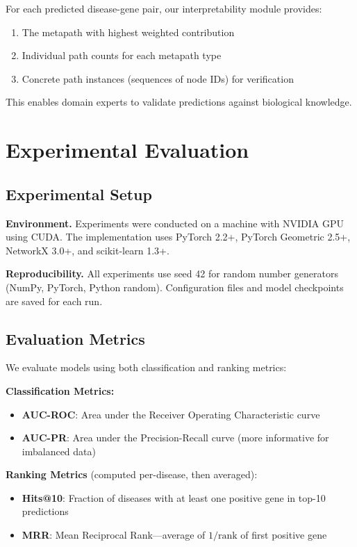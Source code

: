 \documentclass[11pt]{article}
\begin{document}
For each predicted disease-gene pair, our interpretability module provides:
\begin{enumerate}
    \item The metapath with highest weighted contribution
    \item Individual path counts for each metapath type
    \item Concrete path instances (sequences of node IDs) for verification
\end{enumerate}

This enables domain experts to validate predictions against biological knowledge.

\section{Experimental Evaluation}
\label{sec:experiments}

\subsection{Experimental Setup}

\textbf{Environment.} Experiments were conducted on a machine with NVIDIA GPU using CUDA. The implementation uses PyTorch 2.2+, PyTorch Geometric 2.5+, NetworkX 3.0+, and scikit-learn 1.3+.

\textbf{Reproducibility.} All experiments use seed 42 for random number generators (NumPy, PyTorch, Python random). Configuration files and model checkpoints are saved for each run.

\subsection{Evaluation Metrics}

We evaluate models using both classification and ranking metrics:

\textbf{Classification Metrics:}
\begin{itemize}
    \item \textbf{AUC-ROC}: Area under the Receiver Operating Characteristic curve
    \item \textbf{AUC-PR}: Area under the Precision-Recall curve (more informative for imbalanced data)
\end{itemize}

\textbf{Ranking Metrics} (computed per-disease, then averaged):
\begin{itemize}
    \item \textbf{Hits@10}: Fraction of diseases with at least one positive gene in top-10 predictions
    \item \textbf{MRR}: Mean Reciprocal Rank---average of $1/\text{rank}$ of first positive gene
\end{itemize}
\end{document}

